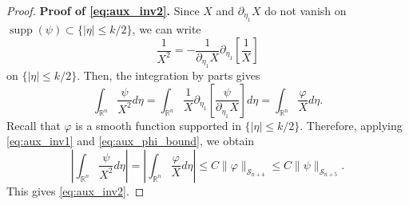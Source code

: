 \documentclass[10pt,a4paper]{amsart}
\begin{document}
\begin{proof}
\textbf{Proof of \eqref{eq:aux_inv2}.}
Since $X$ and $\partial_{\eta_1} X$ do not vanish on $\operatorname{supp} (\psi) \subset \{|\eta|\leq k/2\}$, we can write 
\begin{equation*}
    \frac{1}{X^2} = - \frac{1}{\partial_{\eta_1}X} \partial_{\eta_1} \left[\frac{1}{X}\right]
\end{equation*}
on $\{|\eta|\leq k/2\}$. Then, the integration by parts gives
\begin{equation*}
    \int_{\mathbb{R}^n}\frac{\psi}{X^2}d\eta
    = \int_{\mathbb{R}^n}\frac{1}{X}
    \partial_{\eta_1}\left[\frac{\psi}{\partial_{\eta_1}X}\right]d\eta = \int_{\mathbb{R}^n}\frac{\varphi}{X}
    d\eta.
\end{equation*}
 Recall that $\varphi$ is a smooth function supported in $\{|\eta|\leq k/2\}$. Therefore, applying \eqref{eq:aux_inv1} and \eqref{eq:aux_phi_bound}, we obtain 
\begin{equation*}
    \left|\int_{\mathbb{R}^n}\frac{\psi}{X^2} d\eta\right| 
    = \left|\int_{\mathbb{R}^n}\frac{\varphi}{X} d\eta\right| 
    \leq C\|\varphi\|_{\mathscr{S}_{n+4}} 
    \leq C\|\psi\|_{\mathscr{S}_{n+5}}.
\end{equation*}
This gives \eqref{eq:aux_inv2}.
\end{proof}
\end{document}
